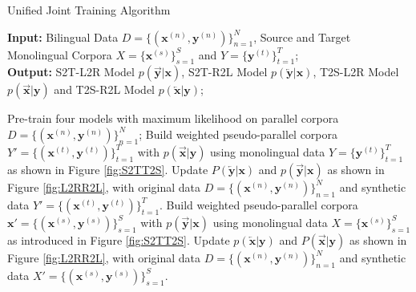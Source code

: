 \documentclass[a4paper]{article}
\begin{document}
\begin{CJK*}{UTF8}{gbsn}
\begin{algorithm}[t]
\caption{Unified Joint Training Algorithm}
\label{alg:unified_joint_training}
\hspace*{\algorithmicindent} \textbf{Input:} Bilingual Data $ D =\{ (\mathbf{x}^{(n)}, \mathbf{y}^{(n)}) \}_{n=1}^{N}$,  Source and Target Monolingual Corpora $X=\{\mathbf{x}^{(s)}\}_{s=1}^{S}$ and $Y=\{\mathbf{y}^{(t)}\}_{t=1}^{T}$;  \\
\hspace*{\algorithmicindent} \textbf{Output:} S2T-L2R Model $ p(\overrightarrow{\mathbf{y}}|\mathbf{x}) $, S2T-R2L Model $ p(\overleftarrow{\mathbf{y}}|\mathbf{x}) $, T2S-L2R Model $ p(\overrightarrow{\mathbf{x}}|\mathbf{y}) $ and T2S-R2L Model $ p(\overleftarrow{\mathbf{x}}|\mathbf{y}) $;
\begin{algorithmic}[1]
\State Pre-train four models with maximum likelihood on parallel corpora $ D =\{ (\mathbf{x}^{(n)}, \mathbf{y}^{(n)}) \}_{n=1}^{N}$;
\State Build weighted pseudo-parallel corpora $Y'=\{ (\mathbf{x}^{(t)}, \mathbf{y}^{(t)}) \}_{t=1}^{T}$ with \( p(\overrightarrow{\mathbf{x}}|\mathbf{y}) \) using monolingual data $Y=\{\mathbf{y}^{(t)}\}_{t=1}^{T}$ as shown in Figure \ref{fig:S2TT2S}.
\State Update $ P(\overleftarrow{\mathbf{y}}|\mathbf{x}) $ and $ p(\overrightarrow{\mathbf{y}}|\mathbf{x}) $  as shown in Figure \ref{fig:L2RR2L}, with original data $ D =\{ (\mathbf{x}^{(n)}, \mathbf{y}^{(n)}) \}_{n=1}^{N}$ and synthetic data $Y'=\{ (\mathbf{x}^{(t)}, \mathbf{y}^{(t)}) \}_{t=1}^{T}$.
\State Build weighted pseudo-parallel corpora $\mathbf{x}'=\{ (\mathbf{x}^{(s)}, \mathbf{y}^{(s)}) \}_{s=1}^{S}$ with \( p(\overrightarrow{\mathbf{y}}|\mathbf{x}) \) using monolingual data $X=\{\mathbf{x}^{(s)}\}_{s=1}^{S}$ as introduced in Figure \ref{fig:S2TT2S}. 
\State Update $ p(\overleftarrow{\mathbf{x}}|\mathbf{y}) $ and $ P(\overrightarrow{\mathbf{x}}|\mathbf{y}) $ as shown in Figure \ref{fig:L2RR2L}, with original data $ D =\{ (\mathbf{x}^{(n)}, \mathbf{y}^{(n)}) \}_{n=1}^{N}$ and synthetic data $X'=\{ (\mathbf{\mathbf{x}}^{(s)}, \mathbf{y}^{(s)}) \}_{s=1}^{S}$.
\EndWhile
\EndProcedure
\end{algorithmic}
\end{algorithm}


\end{CJK*}
\end{document}
